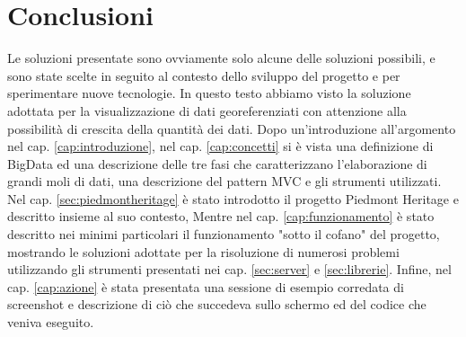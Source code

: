 \chapter{Conclusioni}

Le soluzioni presentate sono ovviamente solo alcune delle soluzioni possibili, e sono state scelte in seguito al contesto dello sviluppo del progetto e per sperimentare nuove tecnologie. 
In questo testo abbiamo visto la soluzione adottata per la visualizzazione di dati georeferenziati con attenzione alla possibilità di crescita della quantità dei dati. Dopo un'introduzione all'argomento nel cap. \ref{cap:introduzione}, nel cap. \ref{cap:concetti} si è vista una definizione di BigData ed una descrizione delle tre fasi che caratterizzano l'elaborazione di grandi moli di dati, una descrizione del pattern MVC e gli strumenti utilizzati. Nel cap. \ref{sec:piedmontheritage} è stato introdotto il progetto Piedmont Heritage e descritto insieme al suo contesto, Mentre nel cap. \ref{cap:funzionamento} è stato descritto nei minimi particolari il funzionamento "sotto il cofano" del progetto, mostrando le soluzioni adottate per la risoluzione di numerosi problemi utilizzando gli strumenti presentati nei cap. \ref{sec:server} e \ref{sec:librerie}. Infine, nel cap. \ref{cap:azione} è stata presentata una sessione di esempio corredata di screenshot e descrizione di ciò che succedeva sullo schermo ed del codice che veniva eseguito.